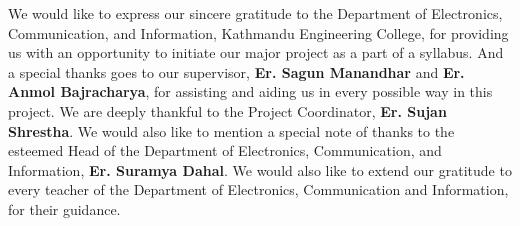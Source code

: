 We would like to express our sincere gratitude to the Department of Electronics, Communication, and Information, Kathmandu Engineering College, for providing us with an opportunity to initiate our major project as a part of a syllabus. And a special thanks goes to our supervisor, \textbf{Er. Sagun Manandhar} and \textbf{Er. Anmol Bajracharya}, for assisting and aiding us in every possible way in this project. We are deeply thankful to the Project Coordinator, \textbf{Er. Sujan Shrestha}. We would also like to mention a special note of thanks to the esteemed Head of the Department of Electronics, Communication, and Information, \textbf{Er. Suramya Dahal}. We would also like to extend our gratitude to every teacher of the Department of Electronics, Communication and Information, for their guidance.